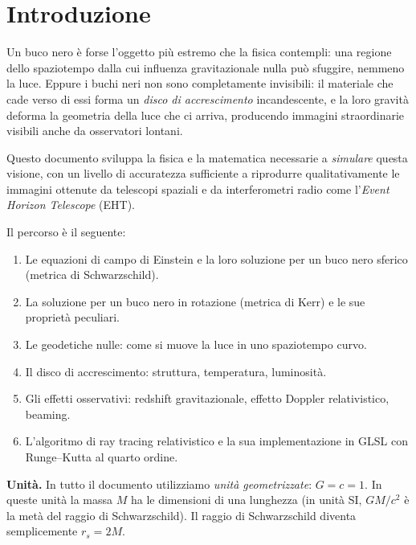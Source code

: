 \documentclass[12pt, a4paper, twoside]{article}
\theoremstyle{definition}
\newcommand{\RS}{r_{\!s}}          %
\begin{document}
\section*{Introduzione}

Un buco nero è forse l'oggetto più estremo che la fisica contempli: una regione
dello spaziotempo dalla cui influenza gravitazionale nulla può sfuggire, nemmeno
la luce. Eppure i buchi neri non sono completamente invisibili: il materiale che
cade verso di essi forma un \emph{disco di accrescimento} incandescente, e la
loro gravità deforma la geometria della luce che ci arriva, producendo immagini
straordinarie visibili anche da osservatori lontani.

Questo documento sviluppa la fisica e la matematica necessarie a \emph{simulare}
questa visione, con un livello di accuratezza sufficiente a riprodurre
qualitativamente le immagini ottenute da telescopi spaziali e da interferometri
radio come l'\textit{Event Horizon Telescope} (EHT).

Il percorso è il seguente:
\begin{enumerate}
  \item Le equazioni di campo di Einstein e la loro soluzione per un buco nero
        sferico (metrica di Schwarzschild).
  \item La soluzione per un buco nero in rotazione (metrica di Kerr) e
        le sue proprietà peculiari.
  \item Le geodetiche nulle: come si muove la luce in uno spaziotempo curvo.
  \item Il disco di accrescimento: struttura, temperatura, luminosità.
  \item Gli effetti osservativi: redshift gravitazionale, effetto Doppler
        relativistico, beaming.
  \item L'algoritmo di ray tracing relativistico e la sua implementazione
        in GLSL con Runge--Kutta al quarto ordine.
\end{enumerate}

\medskip
\noindent\textbf{Unità.} In tutto il documento utilizziamo \emph{unità
geometrizzate}: $G = c = 1$. In queste unità la massa $M$ ha le dimensioni
di una lunghezza (in unità SI, $G M / c^2$ è la metà del raggio di
Schwarzschild). Il raggio di Schwarzschild diventa semplicemente $\RS = 2M$.
\end{document}
